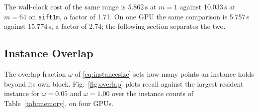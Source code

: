 \documentclass{ieeeaccess}
\begin{document}
The wall-clock cost of the same range is 5.862\,s at $m=1$ against 10.033\,s at
$m=64$ on \texttt{sift1m}, a factor of 1.71. On one GPU the same comparison is
5.757\,s against 15.774\,s, a factor of 2.74; the following section separates the
two.

\subsection{Instance Overlap}
\label{sec:overlap}

The overlap fraction $\omega$ of \eqref{eq:instancesize} sets how many points an
instance holds beyond its own block. Fig.~\ref{fig:overlap} plots recall against
the largest resident instance for $\omega = 0.05$ and $\omega = 1.00$ over the
instance counts of Table~\ref{tab:memory}, on four GPUs.
\end{document}
